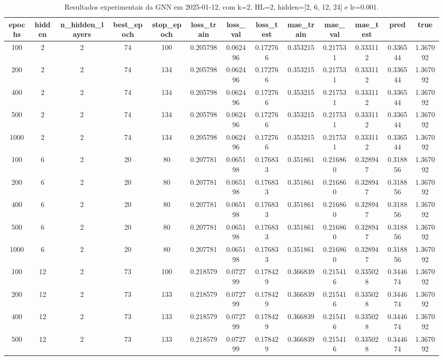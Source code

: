 \begin{table}[h]
\centering
\caption{Resultados experimentais da GNN em 2025-01-12, com k=2, HL=2, hidden=[2, 6, 12, 24] e lr=0.001.}
\label{tab:gnn_results_k2_hl2_d20250112}
\begin{tabular}{ccccccccccccc}
\toprule
epochs & hidden & n\_hidden\_layers & best\_epoch & stop\_epoch & loss\_train & loss\_val & loss\_test & mae\_train & mae\_val & mae\_test & pred & true \\
\midrule
100 & 2 & 2 & 74 & 100 & 0.205798 & 0.062496 & 0.172766 & 0.353215 & 0.217531 & 0.333112 & 0.336544 & 1.367092 \\
200 & 2 & 2 & 74 & 134 & 0.205798 & 0.062496 & 0.172766 & 0.353215 & 0.217531 & 0.333112 & 0.336544 & 1.367092 \\
400 & 2 & 2 & 74 & 134 & 0.205798 & 0.062496 & 0.172766 & 0.353215 & 0.217531 & 0.333112 & 0.336544 & 1.367092 \\
500 & 2 & 2 & 74 & 134 & 0.205798 & 0.062496 & 0.172766 & 0.353215 & 0.217531 & 0.333112 & 0.336544 & 1.367092 \\
1000 & 2 & 2 & 74 & 134 & 0.205798 & 0.062496 & 0.172766 & 0.353215 & 0.217531 & 0.333112 & 0.336544 & 1.367092 \\
100 & 6 & 2 & 20 & 80 & 0.207781 & 0.065198 & 0.176833 & 0.351861 & 0.216860 & 0.328947 & 0.318856 & 1.367092 \\
200 & 6 & 2 & 20 & 80 & 0.207781 & 0.065198 & 0.176833 & 0.351861 & 0.216860 & 0.328947 & 0.318856 & 1.367092 \\
400 & 6 & 2 & 20 & 80 & 0.207781 & 0.065198 & 0.176833 & 0.351861 & 0.216860 & 0.328947 & 0.318856 & 1.367092 \\
500 & 6 & 2 & 20 & 80 & 0.207781 & 0.065198 & 0.176833 & 0.351861 & 0.216860 & 0.328947 & 0.318856 & 1.367092 \\
1000 & 6 & 2 & 20 & 80 & 0.207781 & 0.065198 & 0.176833 & 0.351861 & 0.216860 & 0.328947 & 0.318856 & 1.367092 \\
100 & 12 & 2 & 73 & 100 & 0.218579 & 0.072799 & 0.178429 & 0.366839 & 0.215416 & 0.335028 & 0.344674 & 1.367092 \\
200 & 12 & 2 & 73 & 133 & 0.218579 & 0.072799 & 0.178429 & 0.366839 & 0.215416 & 0.335028 & 0.344674 & 1.367092 \\
400 & 12 & 2 & 73 & 133 & 0.218579 & 0.072799 & 0.178429 & 0.366839 & 0.215416 & 0.335028 & 0.344674 & 1.367092 \\
500 & 12 & 2 & 73 & 133 & 0.218579 & 0.072799 & 0.178429 & 0.366839 & 0.215416 & 0.335028 & 0.344674 & 1.367092 \\

\end{tabular}
\end{table}
